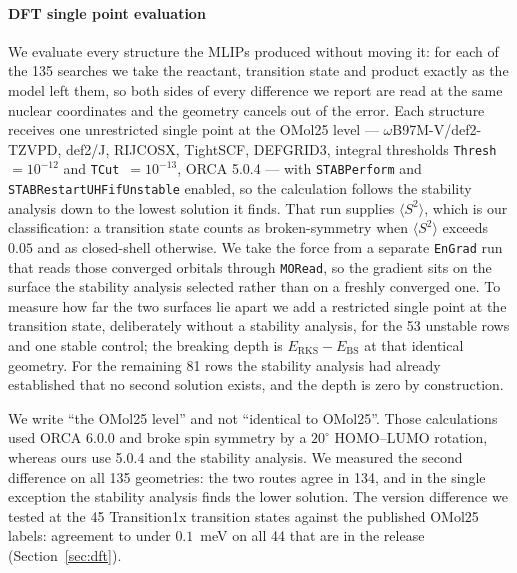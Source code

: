 
\paragraph{DFT single point evaluation}

We evaluate every structure the MLIPs produced without moving it: for each of
the 135 searches we take the reactant, transition state and product exactly as
the model left them, so both sides of every difference we report are read at
the same nuclear coordinates and the geometry cancels out of the error. Each
structure receives one unrestricted single point at the OMol25 level ---
$\omega$B97M-V/def2-TZVPD, def2/J, RIJCOSX, TightSCF, DEFGRID3, integral
thresholds \texttt{Thresh}~$=10^{-12}$ and \texttt{TCut}~$=10^{-13}$, ORCA
5.0.4 --- with \texttt{STABPerform} and \texttt{STABRestartUHFifUnstable}
enabled, so the calculation follows the stability analysis down to the lowest
solution it finds. That run supplies $\langle S^2\rangle$, which is our
classification: a transition state counts as broken-symmetry when
$\langle S^2\rangle$ exceeds $0.05$ and as closed-shell otherwise. We take the force from a separate \texttt{EnGrad} run that
reads those converged orbitals through \texttt{MORead}, so the gradient sits on
the surface the stability analysis selected rather than on a freshly converged
one. To measure how far the two surfaces lie apart we add a restricted single
point at the transition state, deliberately without a stability analysis, for
the 53 unstable rows and one stable control; the breaking depth is
$E_\mathrm{RKS} - E_\mathrm{BS}$ at that identical geometry. For the remaining
81 rows the stability analysis had already established that no second solution
exists, and the depth is zero by construction.

We write ``the OMol25 level'' and not ``identical to OMol25''. Those
calculations used ORCA 6.0.0 and broke spin symmetry by a $20^\circ$
HOMO--LUMO rotation, whereas ours use 5.0.4 and the stability analysis. We
measured the second difference on all 135 geometries: the two routes agree in
134, and in the single exception the stability analysis finds the lower
solution. The version difference we tested at the 45 Transition1x
transition states against the published OMol25 labels: agreement to
under $0.1$~meV on all 44 that are in the release (Section~\ref{sec:dft}).
